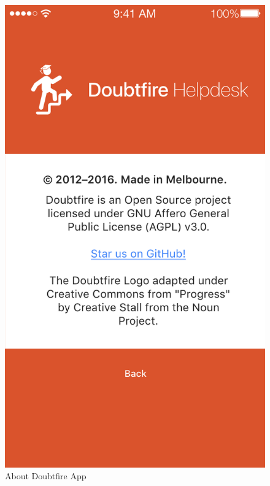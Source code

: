 \documentclass[a4paper,12pt]{article}
\begin{document}
\begin{figure}[p]
\centering
\includegraphics[scale=0.5]{64d7842b85.png}
\caption{About Doubtfire App}
\label{13}
\end{figure}
\end{document}
